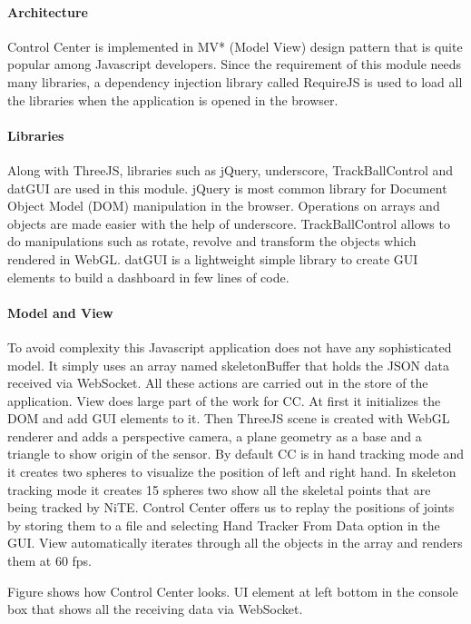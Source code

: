 \paragraph*{Architecture} Control Center is implemented in MV* (Model View) design pattern that is quite popular among Javascript developers. Since the requirement of this module needs many libraries, a dependency injection library called RequireJS is used to load all the libraries when the application is opened in the browser.  

\paragraph*{Libraries} Along with ThreeJS, libraries such as jQuery, underscore, TrackBallControl and datGUI are used in this module. jQuery is most common library for Document Object Model (DOM) manipulation in the browser. Operations on arrays and objects are made easier with the help of underscore. TrackBallControl allows to do manipulations such as rotate, revolve and transform the objects which rendered in WebGL. datGUI is a lightweight simple library to create GUI elements to build a dashboard in few lines of code.

\paragraph*{Model and View} To avoid complexity this Javascript application does not have any sophisticated model. It simply uses an array named skeletonBuffer that holds the JSON data received via WebSocket. All these actions are carried out in the store of the application. View does large part of the work for CC. At first it initializes the DOM and add GUI elements to it. Then ThreeJS scene is created with WebGL renderer and adds a perspective camera, a plane geometry as a base and a triangle to show origin of the sensor. By default CC is in hand tracking mode and it creates two spheres to visualize the position of left and right hand. In skeleton tracking mode it creates 15 spheres two show all the skeletal points that are being tracked by NiTE. Control Center offers us to replay the positions of joints by storing them to a file and selecting Hand Tracker From Data option in the GUI. View automatically iterates through all the objects in the array and renders them at 60 fps. 

Figure shows how Control Center looks. UI element at left bottom in the console box that shows all the receiving data via WebSocket. 